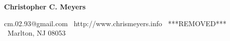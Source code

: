 
\begin{center}
{\LARGE \textbf{Christopher C. Meyers}}
\end{center}
\begin{center}
cm.02.93@gmail.com \textbullet \  http://www.chrismeyers.info \textbullet \ ***REMOVED*** \textbullet \ Marlton, NJ 08053
\end{center}
